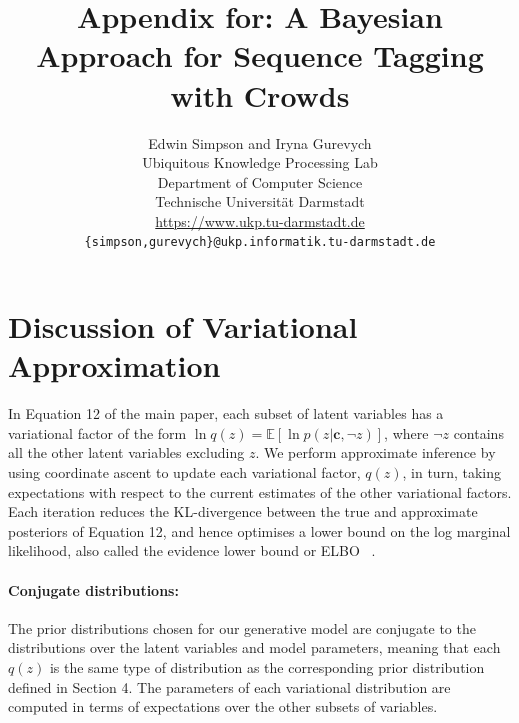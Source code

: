 \documentclass[11pt,a4paper]{article}
\title{Appendix for: A Bayesian Approach for Sequence Tagging with Crowds}
\author{Edwin Simpson and Iryna Gurevych\\
  Ubiquitous Knowledge Processing Lab \\
  Department of Computer Science \\
  Technische Universit\"at Darmstadt \\
  \url{https://www.ukp.tu-darmstadt.de} \\
  {\tt \{simpson,gurevych\}@ukp.informatik.tu-darmstadt.de}
}
\newcommand{\bs}{\boldsymbol}
\begin{document}
\maketitle



\section{Discussion of Variational Approximation}

In Equation 12 of the main paper,
each subset of latent variables has a variational factor of the form 
$\ln q(z) = \mathbb{E}[\ln p(z | \bs c, \neg z)]$, 
where $\neg z$ contains all the other latent variables excluding $z$.
We perform approximate inference by
using coordinate ascent to update each variational factor, $q(z)$, in turn,
taking expectations with respect to the current estimates of the other variational factors.
Each iteration reduces the KL-divergence between the true and approximate posteriors
of Equation 12, and hence optimises a lower bound on the 
log marginal likelihood, also called the evidence lower bound or ELBO
~\cite{Bishop2006,attias_advances_2000}.

\paragraph{Conjugate distributions: }The prior distributions chosen for our generative model are conjugate to the distributions over the
latent variables and model parameters, 
meaning that each $q(z)$ is the same type of distribution
as the corresponding  prior distribution defined in Section 4.
The parameters of each variational distribution are computed in terms  of 
expectations over the other subsets of variables.
\end{document}
